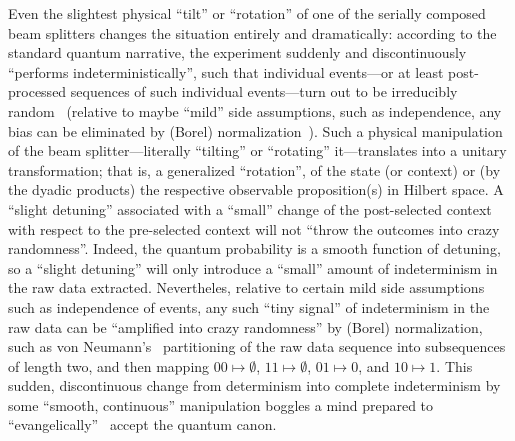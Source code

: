 \documentclass[entropy,article,accept,oneauthor,pdftex]{Definitions/mdpi}
\begin{document}
Even the slightest physical ``tilt'' or ``rotation'' of one of the serially composed beam splitters changes the situation entirely and dramatically:
according to the standard quantum narrative, the experiment suddenly and discontinuously ``performs indeterministically'',
such that individual events---or at least post-processed sequences of such individual events---turn out to be irreducibly random~\cite{zeil-05_nature_ofQuantum}
(relative to maybe ``mild'' side assumptions, such as independence, any bias can be eliminated by (Borel) normalization~\cite{von-neumann1,Taub:1963:JNCa,AbbottCalude10}).
Such a physical manipulation of the beam splitter---literally ``tilting'' or ``rotating'' it---translates into a unitary transformation;
that is, a generalized ``rotation'', of the state (or context)
or (by the dyadic products) the respective observable proposition(s) in Hilbert space.
A ``slight detuning'' associated with a
``small'' change of the post-selected context with respect to the pre-selected context
will not ``throw the outcomes into crazy randomness''.
Indeed, the quantum probability is a smooth function of detuning, so a ``slight detuning'' will
only introduce a ``small'' amount of indeterminism in the raw data extracted.
Nevertheles, relative to certain mild side assumptions such as independence of events,
any such ``tiny signal'' of indeterminism in the raw data can be ``amplified into crazy randomness'' by (Borel) normalization, such as von Neumann's~\cite{von-neumann1}
partitioning of the raw data sequence into subsequences of length two, and then mapping
$00 \mapsto \emptyset$,
$11 \mapsto \emptyset$,
$01 \mapsto 0$, and
$10 \mapsto 1$.
This sudden, discontinuous change from determinism into complete indeterminism by some ``smooth, continuous'' manipulation
boggles a mind prepared to ``evangelically''~\cite{CLAUSER1992,clauser-talkvie}
accept the quantum canon.
\end{document}
